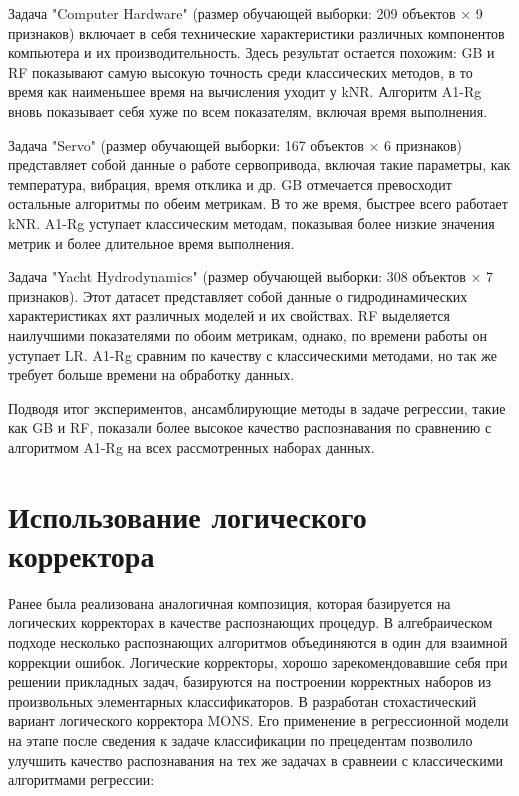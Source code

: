 \documentclass{article}
\begin{document}
Задача "Computer Hardware" (размер обучающей выборки: 209 объектов × 9 признаков) включает в себя технические характеристики различных компонентов компьютера и их производительность. Здесь результат остается похожим: GB и RF показывают самую высокую точность среди классических методов, в то время как наименьшее время на вычисления уходит у kNR. Алгоритм A1-Rg вновь показывает себя хуже по всем показателям, включая время выполнения.

Задача "Servo" (размер обучающей выборки: 167 объектов × 6 признаков) представляет собой данные о работе сервопривода, включая такие параметры, как температура, вибрация, время отклика и др. GB отмечается превосходит остальные алгоритмы по обеим метрикам. В то же время, быстрее всего работает kNR.
A1-Rg уступает классическим методам, показывая более низкие значения метрик и более длительное время выполнения.

Задача "Yacht Hydrodynamics" (размер обучающей выборки: 308 объектов × 7 признаков). Этот датасет представляет собой данные о гидродинамических характеристиках яхт различных моделей и их свойствах. RF выделяется наилучшими показателями по обоим метрикам, однако, по времени работы он уступает LR.
A1-Rg сравним по качеству с классическими методами, но так же требует больше времени на обработку данных.

Подводя итог экспериментов, ансамблирующие методы в задаче регрессии, такие как GB и RF, показали более высокое качество распознавания по сравнению с алгоритмом A1-Rg на всех рассмотренных наборах данных.

\section{Использование логического корректора}
Ранее была реализована аналогичная композиция, которая базируется на логических корректорах в качестве распознающих процедур. В алгебраическом подходе несколько распознающих алгоритмов объединяются в один для взаимной коррекции ошибок. Логические корректоры, хорошо зарекомендовавшие себя при решении прикладных задач, базируются на построении корректных наборов из произвольных элементарных классификаторов. В \cite{lyubimtseva14} разработан стохастический вариант логического корректора MONS. Его применение в регрессионной модели на этапе после сведения к задаче классификации по прецедентам позволило улучшить качество распознавания на тех же задачах в сравнеии с классическими алгоритмами регрессии:
\end{document}
